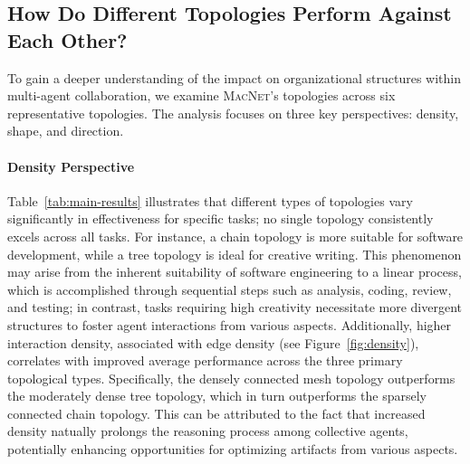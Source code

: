 \documentclass{article}
\begin{document}
\subsection{How Do Different Topologies Perform Against Each Other?}
To gain a deeper understanding of the impact on organizational structures within multi-agent collaboration, we examine \textsc{MacNet}'s topologies across six representative topologies. The analysis focuses on three key perspectives: density, shape, and direction.

\paragraph{Density Perspective}
Table~\ref{tab:main-results} illustrates that different types of topologies vary significantly in effectiveness for specific tasks; no single topology consistently excels across all tasks.
For instance, a chain topology is more suitable for software development, while a tree topology is ideal for creative writing. 
This phenomenon may arise from the inherent suitability of software engineering to a linear process, which is accomplished through sequential steps such as analysis, coding, review, and testing; in contrast, tasks requiring high creativity necessitate more divergent structures to foster agent interactions from various aspects.
Additionally, higher interaction density, associated with edge density (see Figure~\ref{fig:density}), correlates with improved average performance across the three primary topological types. 
Specifically, the densely connected mesh topology outperforms the moderately dense tree topology, which in turn outperforms the sparsely connected chain topology.
This can be attributed to the fact that increased density natually prolongs the reasoning process among collective agents, potentially enhancing opportunities for optimizing artifacts from various aspects.
\end{document}
